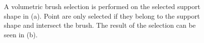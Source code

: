 \begin{figure}
\centering
{}
\caption{A volumetric brush selection is performed on the selected support shape in (a). Point are only selected if they belong to the support shape and intersect the brush. The result of the selection can be seen in (b).}
\label{fig:technologiezentrum_brush}
\end{figure}


